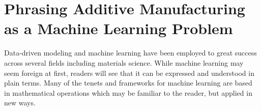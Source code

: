\section{Phrasing Additive Manufacturing as a Machine Learning Problem}\label{phrasing}
Data-driven modeling and machine learning have been employed to great success across several fields including materials science. While machine learning may seem foreign at first, readers will see that it can be expressed and understood in plain terms. Many of the tenets and frameworks for machine learning are based in mathematical operations which may be familiar to the reader, but applied in new ways. 









